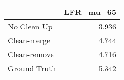 \begin{tabular}{lr}
\toprule
{} & LFR_mu_65 \\
\midrule
No Clean Up  &     3.936 \\
Clean-merge  &     4.744 \\
Clean-remove &     4.716 \\
Ground Truth &     5.342 \\
\bottomrule
\end{tabular}
